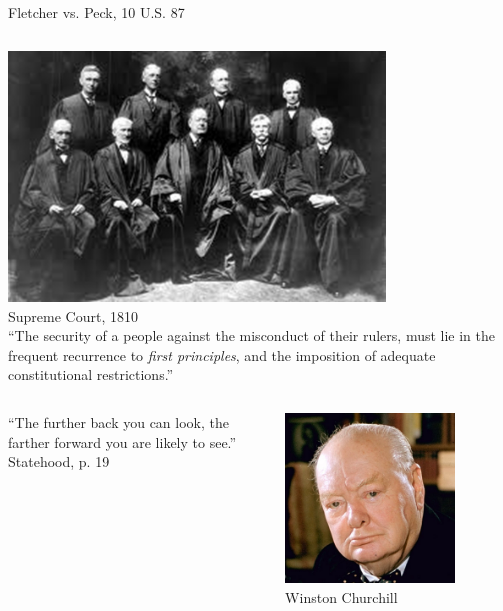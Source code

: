\begin{frame}{Fletcher vs. Peck, 10 U.S. 87}
    \begin{columns}[onlytextwidth]
            \centering
            \includegraphics[width=0.75\textwidth]{img/supreme-court-1810.png} \\
            Supreme Court, 1810 \\

            ``The security of a people against the misconduct of their rulers,
            must lie in the frequent recurrence to \emph{first principles}, and
            the imposition of adequate constitutional restrictions.''
    \end{columns}
\end{frame}

\begin{frame}
    \begin{columns}[onlytextwidth]
            ``The further back you can look, the farther forward you are likely to see.'' \\
            \vspace{20pt} Statehood, p. 19

            \centering
            \includegraphics[width=0.75\textwidth]{img/winston-churchill.png} \\
            Winston Churchill \\
    \end{columns}
\end{frame}


